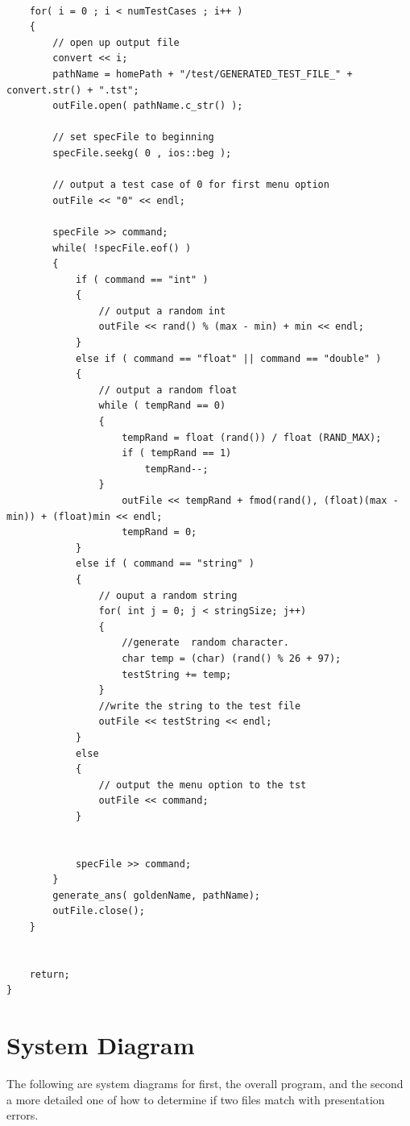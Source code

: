 \begin{lstlisting}
    
    for( i = 0 ; i < numTestCases ; i++ )
    {
        // open up output file
        convert << i;
        pathName = homePath + "/test/GENERATED_TEST_FILE_" + convert.str() + ".tst";
        outFile.open( pathName.c_str() );
        
        // set specFile to beginning 
        specFile.seekg( 0 , ios::beg );
        
        // output a test case of 0 for first menu option
        outFile << "0" << endl;
        
        specFile >> command;
        while( !specFile.eof() )
        {
            if ( command == "int" )
            {
                // output a random int
                outFile << rand() % (max - min) + min << endl;
            }
            else if ( command == "float" || command == "double" )
            {
                // output a random float
                while ( tempRand == 0)
                {
                    tempRand = float (rand()) / float (RAND_MAX);
                    if ( tempRand == 1)
                        tempRand--;
                }
                    outFile << tempRand + fmod(rand(), (float)(max - min)) + (float)min << endl;
                    tempRand = 0;
            }
            else if ( command == "string" )
            {
                // ouput a random string
                for( int j = 0; j < stringSize; j++)
                {
                    //generate  random character.
                    char temp = (char) (rand() % 26 + 97);
                    testString += temp;
                }
                //write the string to the test file
                outFile << testString << endl;
            }
            else
            {
                // output the menu option to the tst
                outFile << command;
            }
            
            
            specFile >> command;
        }
        generate_ans( goldenName, pathName);
        outFile.close();
    }
    
    
    return;
}
\end{lstlisting}


\section {System Diagram}
The following are system diagrams for first, the overall program, and the second a more detailed
one of how to determine if two files match with presentation errors.

